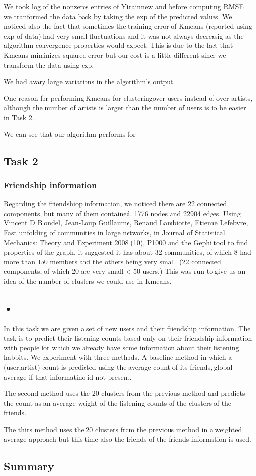 We took log of the nonzeros entries of Ytrainnew and before 
computing RMSE we tranformed the data back by taking the exp
of the predicted values.
We noticed also the fact that sometimes the training error of Kmeans
(reported using exp of data) had very small fluctuations and it was not always decreasig as the algorithm convergence properties would expect. This is due to the fact that Kmeans miminizes squared error but our cost is a little different since we transform the data using exp.

We had avary large variations in the algorithm's output.

One reason for performing Kmeans for clusteringover users 
instead of over artists, although the number of artists is larger than the number of users is to be easier in Task 2.



We can see that our algorithm performs for

\subsection{Task 2}
\subsubsection{Friendship information}
Regarding the friendshiop information, we noticed there are 22 connected components, but many of them contained.
1776 nodes and 22904 edges.
Using Vincent D Blondel, Jean-Loup Guillaume, Renaud Lambiotte, Etienne Lefebvre, Fast unfolding of communities in large networks, in Journal of Statistical Mechanics: Theory and Experiment 2008 (10), P1000 and the Gephi tool to find properties of the graph, it suggested it has about
32 communities, of which 8 had more than 150 members and the others being very small. (22 connected components, of which 20 are very small < 50 users.) This was run to give us an idea of the number of clusters we could use in Kmeans.

\subsection{•}
In this task we are given a set of new users and their friendship information.
The task is to predict their listening counts based only on their friendship information with
people for which we already have some information about their listening habbits.
We experiment with three methods.
 A baseline method in which a (user,artist) count is predicted
using the average count of its friends, global average if that informatino id not present.

The second method uses the 20 clusters from the previous method and predicts the count
as an average weight of the listening counts of the clusters of the friends.

The thirs method uses the 20 clusters from the previous method in a weighted average approach but this time also the friends of the friends information is used. 

\subsection{Summary}



